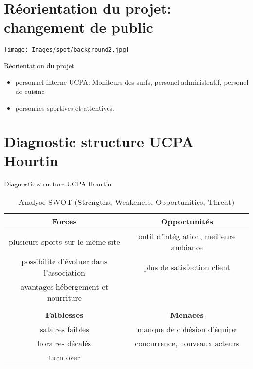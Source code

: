 \documentclass[10pt,a4paper]{beamer}
\begin{document}
\section{Réorientation du projet: changement de public}
{
{
   \texttt{[image: Images/spot/background2.jpg]}
}
\begin{frame}{Réorientation du projet}
\begin{itemize}
\item personnel interne UCPA: Moniteurs des surfs, personel administratif, personel de cuisine
\item personnes sportives et attentives.
\end{itemize}


\end{frame}
}
\section{Diagnostic structure UCPA Hourtin}
\begin{frame}{Diagnostic structure UCPA Hourtin}
\small{
\begin{table}[h]
\centering
\begin{tabular}{|c|c|}
        \hline
        \textbf{Forces}                          & \textbf{Opportunités} \\ 
        \hline
        plusieurs sports sur le m\^eme site      &outil d'intégration, meilleure ambiance\\
        possibilité d'évoluer dans l'association & plus de satisfaction client  \\
        avantages hébergement et nourriture      &                              \\
               &                             \\
        \hline
        \textbf{Faiblesses}                      &  \textbf{Menaces} \\ 
        \hline
        salaires faibles                         & manque de cohésion d'équipe \\
        horaires décalés                         & concurrence, nouveaux acteurs   \\
        turn over                                &                               \\
        \hline
\end{tabular}
\caption{Analyse SWOT (Strengths, Weakeness, Opportunities, Threat)\label{swot}}
\end{table}}
\end{frame}
\end{document}
